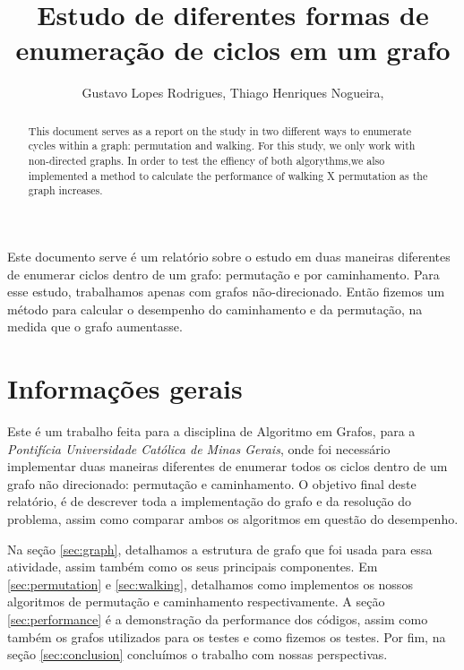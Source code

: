 \documentclass[12pt]{article}
\title{Estudo de diferentes formas de enumeração de ciclos em um grafo}
\author{Gustavo Lopes Rodrigues\inst{1}, Thiago Henriques Nogueira\inst{2},}
\begin{document}
 

  \maketitle

  \begin{abstract} 
    This document serves as a report on the study in two different ways
    to enumerate cycles within a graph: permutation and walking. For this
    study, we only work with non-directed graphs. In order to test the effiency 
    of both algorythms,we also implemented a method to calculate the performance of walking
    X permutation as the graph increases.
  \end{abstract}

  \begin{resumo} 
    Este documento serve é um relatório sobre o estudo em duas maneiras 
    diferentes de enumerar ciclos dentro de um grafo: permutação e por caminhamento. Para esse 
    estudo, trabalhamos apenas com grafos não-direcionado. Então fizemos um método
    para calcular o desempenho do caminhamento e da permutação, na medida que o grafo aumentasse.
  \end{resumo}


  \section{Informações gerais}

    Este é um trabalho feita para a disciplina de Algoritmo em Grafos, para a 
    \emph{Pontifícia Universidade Católica de Minas Gerais}, onde foi necessário 
    implementar duas maneiras diferentes de enumerar todos os ciclos dentro de um 
    grafo não direcionado: permutação e caminhamento. O objetivo final  deste relatório, 
    é de descrever toda a implementação do grafo e da resolução do problema, assim como 
    comparar ambos os algoritmos em questão do desempenho.

    Na seção \ref{sec:graph}, detalhamos a estrutura de grafo que foi usada para essa atividade,
    assim também como os seus principais componentes. Em \ref{sec:permutation} e \ref{sec:walking},
    detalhamos como implementos os nossos algoritmos de permutação e caminhamento respectivamente.
    A seção \ref{sec:performance} é a demonstração da performance dos códigos, assim como também 
    os grafos utilizados para os testes e como fizemos os testes. Por fim, na seção \ref{sec:conclusion}
    concluímos o trabalho com nossas perspectivas.
\end{document}
